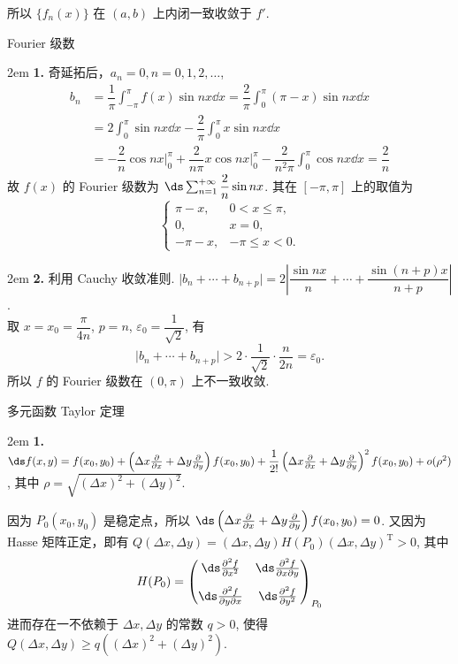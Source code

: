 \documentclass[UTF8,14pt,normal]{ctexart}
\begin{document}
    所以 \(\{f_n(x)\}\) 在 \((a, b)\) 上内闭一致收敛于 \(f'\).

 Fourier 级数

    \hangindent 2em
    \noindent
    \textbf{1.} 奇延拓后，\(a_n = 0, n = 0, 1, 2, \ldots\),
    \begin{align*}
        b_n & = \dfrac{1}{\pi} \int_{- \pi}^{\pi} f(x) \sin nx \dd{x} = \dfrac{2}{\pi} \int_0^{\pi} (\pi - x) \sin nx \dd{x} \\
        & = 2 \int_0^{\pi} \sin nx \dd{x} - \dfrac{2}{\pi} \int_0^{\pi} x \sin nx \dd{x} \\
        & = -\dfrac{2}{n} \cos nx \bigg|_0^{\pi} + \dfrac{2}{n\pi} x\cos nx \bigg|_0^{\pi} - \dfrac{2}{n^2\pi} \int_0^{\pi} \cos nx \dd{x} = \dfrac{2}{n}
    \end{align*}
    故 \(f(x)\) 的 Fourier 级数为 \(\ds \sum_{n = 1}^{+\infty} \dfrac{2}{n} \sin nx\). 其在 \([- \pi, \pi]\) 上的取值为
    \[
        \begin{cases}
            \pi - x, & 0 < x \leqslant \pi, \\
            0, & x = 0, \\
            - \pi - x, & - \pi \leqslant x < 0.
        \end{cases}
    \]

    \hangindent 2em
    \noindent
    \textbf{2.} 利用 Cauchy 收敛准则. \(\lvert b_n + \cdots + b_{n + p} \rvert = 2 \left\lvert \dfrac{\sin nx}{n} + \cdots + \dfrac{\sin (n + p)x}{n + p} \right\rvert \). \\
    取 \(x = x_0 = \dfrac{\pi}{4n}\), \(p = n\), \(\varepsilon_0 = \dfrac{1}{\sqrt{2}}\), 有
    \[
        \lvert b_n + \cdots + b_{n + p} \rvert > 2 \cdot \dfrac{1}{\sqrt{2}} \cdot \dfrac{n}{2n} = \varepsilon_0.
    \]
    所以 \(f\) 的 Fourier 级数在 \((0, \pi)\) 上不一致收敛.

 多元函数 Taylor 定理

    \hangindent 2em
    \noindent
    \textbf{1.} \(\ds f(x, y) = f(x_0, y_0) + \left(\Delta x \pdv{x} + \Delta y \pdv{y}\right) f(x_0, y_0) + \dfrac{1}{2!} \left(\Delta x \pdv{x} + \Delta y \pdv{y}\right)^2 f(x_0, y_0) + o(\rho^2)\), 其中 \(\rho = \sqrt{(\Delta x)^2 + (\Delta y)^2}\).

    因为 \(P_0 (x_0, y_0)\) 是稳定点，所以 \(\ds \left(\Delta x \pdv{x} + \Delta y \pdv{y}\right) f(x_0, y_0) = 0\). 又因为 Hasse 矩阵正定，即有 \(Q(\Delta x, \Delta y) = (\Delta x, \Delta y)H(P_0)(\Delta x, \Delta y)^\mathrm{T} > 0\), 其中
    \[
        H(P_0) = \begin{pmatrix}
            \ds\pdv[2]{f}{x} & \ds\pdv{f}{x}{y} \\[2ex]
            \ds\pdv{f}{y}{x} & \ds\pdv[2]{f}{y}
        \end{pmatrix}_{P_0}
    \]
    进而存在一不依赖于 \(\Delta x, \Delta y\) 的常数 \(q > 0\), 使得 \(Q(\Delta x, \Delta y) \geqslant q ((\Delta x)^2 + (\Delta y)^2)\).
\end{document}
